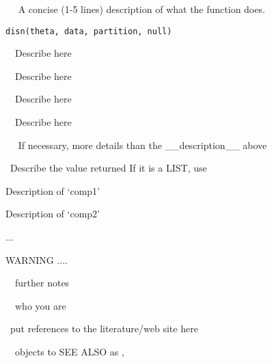 \begin{Description}\relax
~~ A concise (1-5 lines) description of what the function does. ~~\end{Description}
\begin{Usage}
\begin{verbatim}
disn(theta, data, partition, null)
\end{verbatim}
\end{Usage}
\begin{Arguments}
\begin{ldescription}
\item[\code{theta}] ~~Describe  here~~ 
\item[\code{data}] ~~Describe  here~~ 
\item[\code{partition}] ~~Describe  here~~ 
\item[\code{null}] ~~Describe  here~~ 
\end{ldescription}
\end{Arguments}
\begin{Details}\relax
~~ If necessary, more details than the __description__  above ~~\end{Details}
\begin{Value}
~Describe the value returned
If it is a LIST, use
\begin{ldescription}
\item[\code{comp1 }] Description of `comp1'
\item[\code{comp2 }] Description of `comp2'
\end{ldescription}

...\end{Value}
\begin{Section}{WARNING}
....\end{Section}
\begin{Note}\relax
~~further notes~~\end{Note}
\begin{Author}\relax
~~who you are~~\end{Author}
\begin{References}\relax
~put references to the literature/web site here ~\end{References}
\begin{SeeAlso}\relax
~~objects to SEE ALSO as , ~~~\end{SeeAlso}
